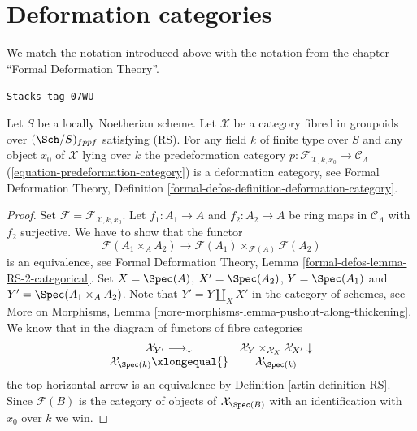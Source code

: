 \section{Deformation categories}
\label{artin-section-deformation-categories}
We match the notation introduced above with the notation from the
chapter ``Formal Deformation Theory''.

\begin{lemma}
\label{artin-lemma-deformation-category}
\href{https://stacks.math.columbia.edu/tag/07WU}{\texttt{Stacks tag 07WU}}

Let $S$ be a locally Noetherian scheme. Let $\mathcal{X}$ be a category
fibred in groupoids over $(\Sch/S)_{fppf}$ satisfying (RS). For any field
$k$ of finite type over $S$ and any object $x_0$ of $\mathcal{X}$ lying
over $k$ the predeformation category
$p : \mathcal{F}_{\mathcal{X}, k, x_0} \to \mathcal{C}_\Lambda$
(\ref{equation-predeformation-category}) is a deformation category, see
Formal Deformation Theory, Definition
\ref{formal-defos-definition-deformation-category}.
\end{lemma}

\begin{proof}

Set $\mathcal{F} = \mathcal{F}_{\mathcal{X}, k, x_0}$.
Let $f_1 : A_1 \to A$ and $f_2 : A_2 \to A$ be ring maps in
$\mathcal{C}_\Lambda$ with $f_2$ surjective. We have to show that
the functor
$$
\mathcal{F}(A_1 \times_A A_2)
\longrightarrow
\mathcal{F}(A_1) \times_{\mathcal{F}(A)} \mathcal{F}(A_2)
$$
is an equivalence, see
Formal Deformation Theory, Lemma \ref{formal-defos-lemma-RS-2-categorical}.
Set $X = \Spec(A)$, $X' = \Spec(A_2)$, $Y = \Spec(A_1)$ and
$Y' = \Spec(A_1 \times_A A_2)$. Note that $Y' = Y \amalg_X X'$ in the
category of schemes, see
More on Morphisms, Lemma \ref{more-morphisms-lemma-pushout-along-thickening}.
We know that in the diagram of functors of fibre categories
$$
\begin{array}{cc}\mathcal{X}_{Y'} \longrightarrow\downarrow & \mathcal{X}_Y \times_{\mathcal{X}_X} \mathcal{X}_{X'} \downarrow \\ \mathcal{X}_{\Spec(k)} \xlongequal{} & \mathcal{X}_{\Spec(k)}\end{array}
$$
the top horizontal arrow is an equivalence by
Definition \ref{artin-definition-RS}.
Since $\mathcal{F}(B)$ is the category of objects of $\mathcal{X}_{\Spec(B)}$
with an identification with $x_0$ over $k$ we win.
\end{proof}

